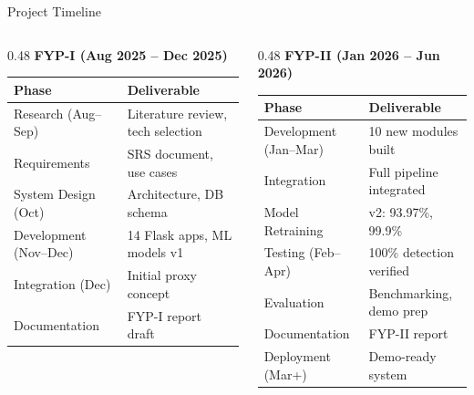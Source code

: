 \documentclass[aspectratio=169,12pt]{beamer}
\begin{document}
\begin{frame}{Project Timeline}
  \begin{columns}[T]
    \begin{column}{0.48\textwidth}
      \textbf{\textcolor{dcCyan}{FYP-I (Aug 2025 -- Dec 2025)}}\\[0.2em]
      \centering\tiny
      \begin{tabular}{@{}ll@{}}
        \toprule
        \rowcolor{dcMid}
        \textcolor{dcCyan}{Phase} & \textcolor{dcCyan}{Deliverable}\\
        \midrule
        Research (Aug--Sep)  & Literature review, tech selection\\
        \rowcolor{dcDark}
        Requirements         & SRS document, use cases\\
        System Design (Oct)  & Architecture, DB schema\\
        \rowcolor{dcDark}
        Development (Nov--Dec) & 14 Flask apps, ML models v1\\
        Integration (Dec)    & Initial proxy concept\\
        \rowcolor{dcDark}
        Documentation        & FYP-I report draft\\
        \bottomrule
      \end{tabular}
    \end{column}
    \begin{column}{0.48\textwidth}
      \textbf{\textcolor{dcGreen}{FYP-II (Jan 2026 -- Jun 2026)}}\\[0.2em]
      \centering\tiny
      \begin{tabular}{@{}ll@{}}
        \toprule
        \rowcolor{dcMid}
        \textcolor{dcCyan}{Phase} & \textcolor{dcCyan}{Deliverable}\\
        \midrule
        Development (Jan--Mar) & 10 new modules built\\
        \rowcolor{dcDark}
        Integration            & Full pipeline integrated\\
        Model Retraining       & v2: 93.97\%, 99.9\%\\
        \rowcolor{dcDark}
        Testing (Feb--Apr)     & 100\% detection verified\\
        Evaluation             & Benchmarking, demo prep\\
        \rowcolor{dcDark}
        Documentation          & FYP-II report\\
        Deployment (Mar+)      & Demo-ready system\\
        \bottomrule
      \end{tabular}
    \end{column}
  \end{columns}
\end{frame}
\end{document}

